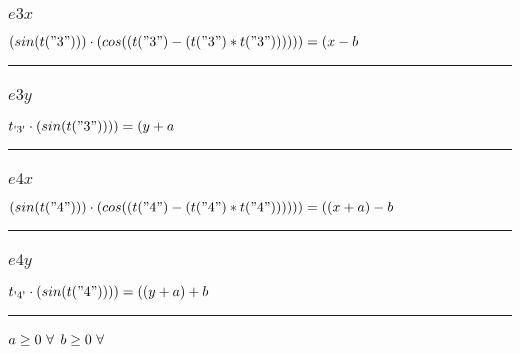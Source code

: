 \documentclass[11pt]{article}
\begin{document}
\subsubsection*{$e3x$}
$
( sin(t("3")) ) \cdot ( cos((t("3") - (t("3") * t("3")))) )) = (x - b
$
\vspace{5pt}
\hrule
\subsubsection*{$e3y$}
$
t_\text{\text{\textquotesingle 3\textquotesingle}} \cdot ( sin(t("3")) )) = (y + a
$
\vspace{5pt}
\hrule
\subsubsection*{$e4x$}
$
( sin(t("4")) ) \cdot ( cos((t("4") - (t("4") * t("4")))) )) = ((x + a) - b
$
\vspace{5pt}
\hrule
\subsubsection*{$e4y$}
$
t_\text{\text{\textquotesingle 4\textquotesingle}} \cdot ( sin(t("4")) )) = ((y + a) + b
$
\vspace{5pt}
\hrule
\bigskip
$a\geq 0 ~ \forall \\$
$b\geq 0 ~ \forall \\$
\end{document}
